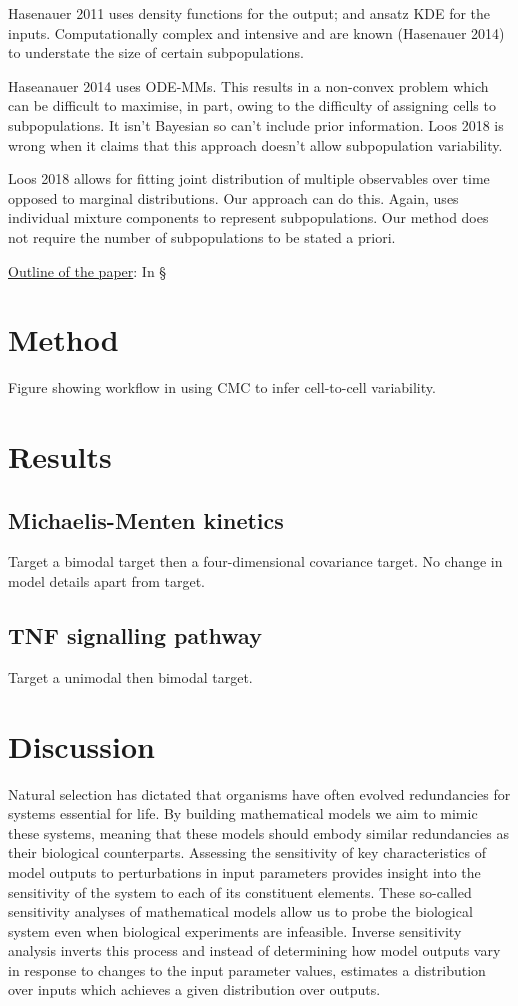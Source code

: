 \documentclass[10pt,letterpaper]{article}
\begin{document}
Hasenauer 2011 uses density functions for the output; and ansatz KDE for the inputs. Computationally complex and intensive and are known (Hasenauer 2014) to understate the size of certain subpopulations.

Haseanauer 2014 uses ODE-MMs. This results in a non-convex problem which can be difficult to maximise, in part, owing to the difficulty of assigning cells to subpopulations. It isn't Bayesian so can't include prior information. Loos 2018 is wrong when it claims that this approach doesn't allow subpopulation variability.

Loos 2018 allows for fitting joint distribution of multiple observables over time opposed to marginal distributions. Our approach can do this. Again, uses individual mixture components to represent subpopulations. Our method does not require the number of subpopulations to be stated a priori.



\bigskip
\noindent\underline{Outline of the paper}: In \S 

\section{Method}
Figure showing workflow in using CMC to infer cell-to-cell variability.

\section{Results}

\subsection{Michaelis-Menten kinetics}
Target a bimodal target then a four-dimensional covariance target. No change in model details apart from target.

\subsection{TNF signalling pathway}
Target a unimodal then bimodal target.


\section{Discussion}
\label{sec:discussion}

Natural selection has dictated that organisms have often evolved redundancies for systems essential for life. By building mathematical models we aim to mimic these systems, meaning that these models should embody similar redundancies as their biological counterparts. Assessing the sensitivity of key characteristics of model outputs to perturbations in input parameters provides insight into the sensitivity of the system to each of its constituent elements. These so-called sensitivity analyses of mathematical models allow us to probe the biological system even when biological experiments are infeasible. Inverse sensitivity analysis inverts this process and instead of determining how model outputs vary in response to changes to the input parameter values, estimates a distribution over inputs which achieves a given distribution over outputs.
\end{document}
